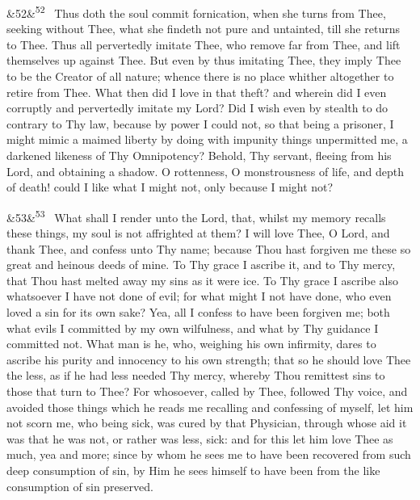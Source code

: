 \documentclass[12pt]{article}
\newcommand{\para}[1][]{\par\noindent\ifx&#1&\else\textsuperscript{\footnotesize #1}~\fi}
\begin{document}
\para[52] Thus doth the soul commit fornication, when she turns from Thee, seeking without Thee, what she findeth not pure and untainted, till she returns to Thee. Thus all pervertedly imitate Thee, who remove far from Thee, and lift themselves up against Thee. But even by thus imitating Thee, they imply Thee to be the Creator of all nature; whence there is no place whither altogether to retire from Thee. What then did I love in that theft? and wherein did I even corruptly and pervertedly imitate my Lord? Did I wish even by stealth to do contrary to Thy law, because by power I could not, so that being a prisoner, I might mimic a maimed liberty by doing with impunity things unpermitted me, a darkened likeness of Thy Omnipotency? Behold, Thy servant, fleeing from his Lord, and obtaining a shadow. O rottenness, O monstrousness of life, and depth of death! could I like what I might not, only because I might not?

\para[53] What shall I render unto the Lord, that, whilst my memory recalls these things, my soul is not affrighted at them? I will love Thee, O Lord, and thank Thee, and confess unto Thy name; because Thou hast forgiven me these so great and heinous deeds of mine. To Thy grace I ascribe it, and to Thy mercy, that Thou hast melted away my sins as it were ice. To Thy grace I ascribe also whatsoever I have not done of evil; for what might I not have done, who even loved a sin for its own sake? Yea, all I confess to have been forgiven me; both what evils I committed by my own wilfulness, and what by Thy guidance I committed not. What man is he, who, weighing his own infirmity, dares to ascribe his purity and innocency to his own strength; that so he should love Thee the less, as if he had less needed Thy mercy, whereby Thou remittest sins to those that turn to Thee? For whosoever, called by Thee, followed Thy voice, and avoided those things which he reads me recalling and confessing of myself, let him not scorn me, who being sick, was cured by that Physician, through whose aid it was that he was not, or rather was less, sick: and for this let him love Thee as much, yea and more; since by whom he sees me to have been recovered from such deep consumption of sin, by Him he sees himself to have been from the like consumption of sin preserved.
\end{document}
